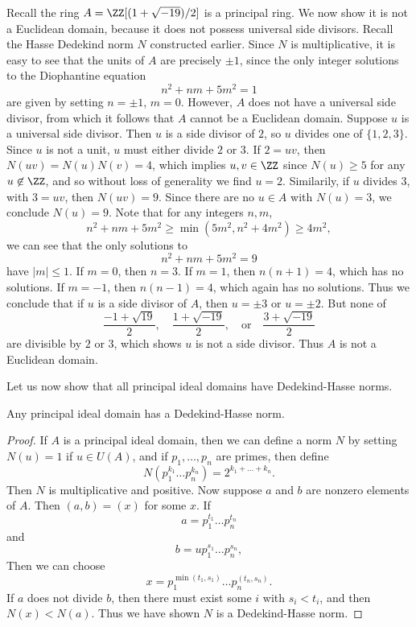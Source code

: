 \begin{example}
    Recall the ring $A = \ZZ[(1 + \sqrt{-19})/2]$ is a principal ring. We now show it is not a Euclidean domain, because it does not possess universal side divisors. Recall the Hasse Dedekind norm $N$ constructed earlier. Since $N$ is multiplicative, it is easy to see that the units of $A$ are precisely $\pm 1$, since the only integer solutions to the Diophantine equation
    \[ n^2 + nm + 5m^2 = 1 \]
    are given by setting $n = \pm 1$, $m = 0$. However, $A$ does not have a universal side divisor, from which it follows that $A$ cannot be a Euclidean domain. Suppose $u$ is a universal side divisor. Then $u$ is a side divisor of $2$, so $u$ divides one of $\{ 1,2,3 \}$. Since $u$ is not a unit, $u$ must either divide $2$ or $3$. If $2 = uv$, then $N(uv) = N(u)N(v) = 4$, which implies $u,v \in \ZZ$ since $N(u) \geq 5$ for any $u \not \in \ZZ$, and so without loss of generality we find $u = 2$. Similarily, if $u$ divides $3$, with $3 = uv$, then $N(uv) = 9$. Since there are no $u \in A$ with $N(u) = 3$, we conclude $N(u) = 9$. Note that for any integers $n,m$,
    \[ n^2 + nm + 5m^2 \geq \min(5m^2,n^2 + 4m^2) \geq 4m^2, \]
    we can see that the only solutions to
    \[ n^2 + nm + 5m^2 = 9 \]
    have $|m| \leq 1$. If $m = 0$, then $n = 3$. If $m = 1$, then $n(n+1) = 4$, which has no solutions. If $m = -1$, then $n(n-1) = 4$, which again has no solutions. Thus we conclude that if $u$ is a side divisor of $A$, then $u = \pm 3$ or $u = \pm 2$. But none of
    \[ \frac{-1 + \sqrt{19}}{2},\quad \frac{1 + \sqrt{-19}}{2},\quad\text{or}\quad \frac{3 + \sqrt{-19}}{2} \]
    are divisible by $2$ or $3$, which shows $u$ is not a side divisor. Thus $A$ is not a Euclidean domain.
\end{example}

Let us now show that all principal ideal domains have Dedekind-Hasse norms.

\begin{theorem}
    Any principal ideal domain has a Dedekind-Hasse norm.
\end{theorem}
\begin{proof}
    If $A$ is a principal ideal domain, then we can define a norm $N$ by setting $N(u) = 1$ if $u \in U(A)$, and if $p_1, \dots, p_n$ are primes, then define
    \[ N(p_1^{k_1} \dots p_n^{k_n}) = 2^{k_1 + \dots + k_n}. \]
    Then $N$ is multiplicative and positive. Now suppose $a$ and $b$ are nonzero elements of $A$. Then $(a,b) = (x)$ for some $x$. If
    \[ a = p_1^{t_1} \dots p_n^{t_n} \]
    and
    \[ b = u p_1^{s_1} \dots p_n^{s_n}, \]
    Then we can choose
    \[ x = p_1^{\min(t_1,s_1)} \dots p_n^{(t_n,s_n)}. \]
    If $a$ does not divide $b$, then there must exist some $i$ with $s_i < t_i$, and then $N(x) < N(a)$. Thus we have shown $N$ is a Dedekind-Hasse norm.
\end{proof}

